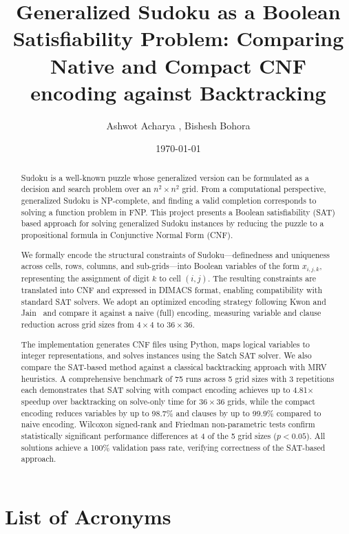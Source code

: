 \documentclass[12pt]{article}
\author{Ashwot Acharya , Bishesh Bohora}
\title{Generalized Sudoku as a Boolean Satisfiability Problem: Comparing Native and Compact CNF encoding against Backtracking}
\date{\today}
\let\cite\citep
\begin{document}
\maketitle
\begin{abstract}
Sudoku is a well-known puzzle whose generalized version can be formulated as a decision and search problem over an $n^2 \times n^2$ grid. From a computational perspective, generalized Sudoku is NP-complete, and finding a valid completion corresponds to solving a function problem in FNP. This project presents a Boolean satisfiability (SAT) based approach for solving generalized Sudoku instances by reducing the puzzle to a propositional formula in Conjunctive Normal Form (CNF).

We formally encode the structural constraints of Sudoku---definedness and uniqueness across cells, rows, columns, and sub-grids---into Boolean variables of the form $x_{i,j,k}$, representing the assignment of digit $k$ to cell $(i,j)$. The resulting constraints are translated into CNF and expressed in DIMACS format, enabling compatibility with standard SAT solvers. We adopt an optimized encoding strategy following Kwon and Jain~\cite{KwonJain2006} and compare it against a naive (full) encoding, measuring variable and clause reduction across grid sizes from $4\times4$ to $36\times36$.

The implementation generates CNF files using Python, maps logical variables to integer representations, and solves instances using the Satch SAT solver. We also compare the SAT-based method against a classical backtracking approach with MRV heuristics. A comprehensive benchmark of 75 runs across 5 grid sizes with 3 repetitions each demonstrates that SAT solving with compact encoding achieves up to 4.81$\times$ speedup over backtracking on solve-only time for $36\times36$ grids, while the compact encoding reduces variables by up to 98.7\% and clauses by up to 99.9\% compared to naive encoding. Wilcoxon signed-rank and Friedman non-parametric tests confirm statistically significant performance differences at 4 of the 5 grid sizes ($p < 0.05$). All solutions achieve a 100\% validation pass rate, verifying correctness of the SAT-based approach.
\end{abstract}
\newpage
\tableofcontents
\newpage

\section*{List of Acronyms}
\end{document}

